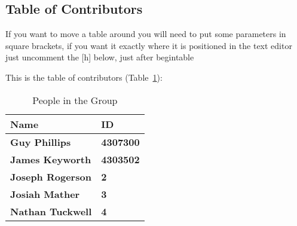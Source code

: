 \subsection{Table of Contributors}


If you want to move a table around you will need to put some parameters in square brackets, if you want it exactly where it is positioned in the text editor just uncomment the [h] below, just after begin{table}

This is the table of contributors (Table~\ref{authors}):
\begin{table}%
\centering
\caption{People in the Group}
\label{authors}
\begin{tabular}{|l|l|}
\hline
\textbf{Name} & \textbf{ID} \\
\hline
\textbf{Guy Phillips} & \textbf{4307300} \\
\hline
\textbf{James Keyworth} & \textbf{4303502} \\
\hline
\textbf{Joseph Rogerson} & \textbf{2} 
\\
\hline
\textbf{Josiah Mather} & \textbf{3} \\
\hline
\textbf{Nathan Tuckwell} & \textbf{4} \\
\hline
\end{tabular}
\end{table}